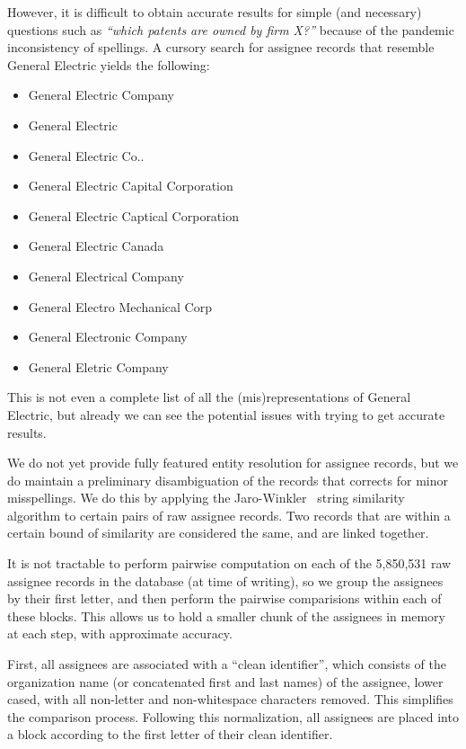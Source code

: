However, it is difficult to obtain accurate results for simple (and
necessary) questions such as \emph{``which patents are owned by firm
X?''} because of the pandemic inconsistency of spellings. A cursory
search for assignee records that resemble General Electric yields
the following:
\begin{itemize}
\item General Electric Company 
\item General Electric 
\item General Electric Co.. 
\item General Electric Capital Corporation 
\item General Electric Captical Corporation 
\item General Electric Canada 
\item General Electrical Company 
\item General Electro Mechanical Corp 
\item General Electronic Company 
\item General Eletric Company 
\end{itemize}
This is not even a complete list of all the (mis)representations of
General Electric, but already we can see the potential issues with
trying to get accurate results.

We do not yet provide fully featured entity resolution for assignee
records, but we do maintain a preliminary disambiguation of the records
that corrects for minor misspellings. We do this by applying the Jaro-Winkler~\cite{jw}
string similarity algorithm to certain pairs of raw assignee records.
Two records that are within a certain bound of similarity are considered
the same, and are linked together.

It is not tractable to perform pairwise computation on each of the
5,850,531 raw assignee records in the database (at time of writing),
so we group the assignees by their first letter, and then perform
the pairwise comparisions within each of these blocks. This allows
us to hold a smaller chunk of the assignees in memory at each step,
with approximate accuracy.

First, all assignees are associated with a ``clean identifier'', which consists
of the organization name (or concatenated first and last names) of the
assignee, lower cased, with all non-letter and non-whitespace characters
removed. This simplifies the comparison process. Following this normalization,
all assignees are placed into a block according to the first letter of their clean
identifier.

